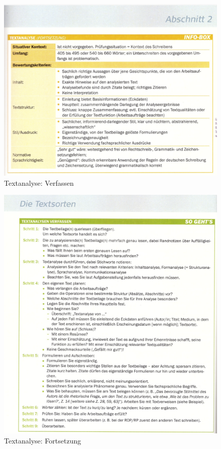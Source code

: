 \begin{figure}[h]
    \centering
    \includegraphics[scale=0.8]{pics/Screenshot from 2023-02-06 12-30-55.png}
    \caption{Textanalyse: Verfassen}
    \label{fig:impl:Textanalyse2}
\end{figure}
\begin{figure}[h]
    \centering
    \includegraphics[scale=0.8]{pics/Screenshot from 2023-02-06 12-31-09.png}
    \caption{Textanalyse: Fortsetzung}
    \label{fig:impl:Textanalyse3}
\end{figure}
